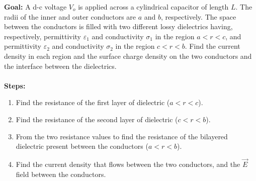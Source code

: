 \documentclass[../../header.tex]{subfiles}
\begin{document}
\textbf{Goal:} A d-c voltage $V_o$ is applied across a cylindrical capacitor of length $L$. The radii of the inner and outer conductors are $a$ and $b$, respectively. The space between the conductors is filled with two different lossy dielectrics having, respectively, permittivity $\varepsilon_1$ and conductivity $\sigma_1$ in the region $a < r < c$, and permittivity $\varepsilon_2$ and conductivity $\sigma_2$ in the region $c < r < b$. Find the current density in each region and the surface charge density on the two conductors and the interface between the dielectrics.\\
\\
\textbf{Steps:} 
\begin{enumerate}

\item Find the resistance of the first layer of dielectric ($a < r < c$).\\

\item Find the resistance of the second layer of dielectric ($c < r < b$).\\

\item From the two resistance values to find the resistance of the bilayered dielectric present between the conductors ($a < r < b$).\\

\item Find the current density that flows between the two conductors, and the $\vec{E}$ field between the conductors.\\


\end{enumerate}
\end{document}
